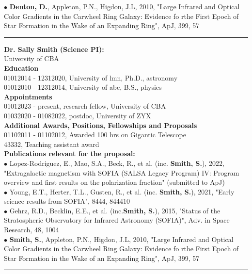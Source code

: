 {\scriptsize{$\bullet$}} \textbf{Denton, D.}, Appleton, P.N., Higdon, J.L, 2010, "Large Infrared and Optical Color Gradients in the Carwheel Ring Galaxy: Evidence fo rthe First Epoch of Star Formation in the Wake of an Expanding Ring", ApJ, 399, 57\\
\medskip \hrule \vspace{5pt} \medskip
\textbf{\color{Blue}\large Dr. Sally Smith (Science PI):}\\
University of CBA\\
\medskip
\textbf{Education}\\
01012014 - 12312020, University of lmn, Ph.D., astronomy\\
01012010 - 12312014, University of abc, B.S., physics\\
\vspace{2ex}
\textbf{Appointments}\\
01012023 - present, research fellow, University of CBA\\
01032020 - 01082022, postdoc, University of ZYX\\
\vspace{2ex}
\textbf{Additional Awards, Positions, Fellowships and Proposals}\\
01102011 - 01102012, Awarded 100 hrs on Gigantic Telescope\\
43332, Teaching assistant award\\
\vspace{2ex}
\textbf{Publications relevant for the proposal:}\\
{\scriptsize{$\bullet$}} Lopez-Rodriguez, E., Mao, S.A., Beck, R., et al. (inc. \textbf{Smith, S.}), 2022, "Extragalactic magnetism with SOFIA (SALSA Legacy Program) IV: Program overview and first results on the polarization fraction" (submitted to ApJ)\\
{\scriptsize{$\bullet$}} Young, E.T., Herter, T.L., Gusten, R., et al. (inc. \textbf{Smith, S.}), 2021, "Early science results from SOFIA", 8444, 844410\\
{\scriptsize{$\bullet$}} Gehrz, R.D., Becklin, E.E., et al. (inc.\textbf{Smith, S.}), 2015, "Status of the Stratospheric Observatory for Infrared Astronomy (SOFIA)", Adv. in Space Research, 48, 1004\\
{\scriptsize{$\bullet$}} \textbf{Smith, S.}, Appleton, P.N., Higdon, J.L, 2010, "Large Infrared and Optical Color Gradients in the Carwheel Ring Galaxy: Evidence fo rthe First Epoch of Star Formation in the Wake of an Expanding Ring", ApJ, 399, 57\\
\medskip \hrule \vspace{5pt} \medskip
